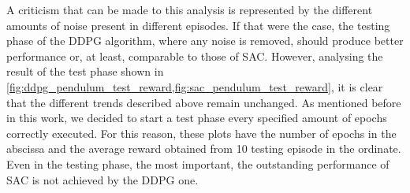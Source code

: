 A criticism that can be made to this analysis is represented by the different amounts of noise present in different episodes.
If that were the case, the testing phase of the DDPG algorithm, where any noise is removed, should produce better performance or, at least, comparable to those of SAC.
However, analysing the result of the test phase shown in \vref{fig:ddpg_pendulum_test_reward,fig:sac_pendulum_test_reward}, it is clear that the different trends described above remain unchanged.
As mentioned before in this work, we decided to start a test phase every specified amount of epochs correctly executed.
For this reason, these plots have the number of epochs in the abscissa and the average reward obtained from 10 testing episode in the ordinate.
Even in the testing phase, the most important, the outstanding performance of SAC is not achieved by the DDPG one.

